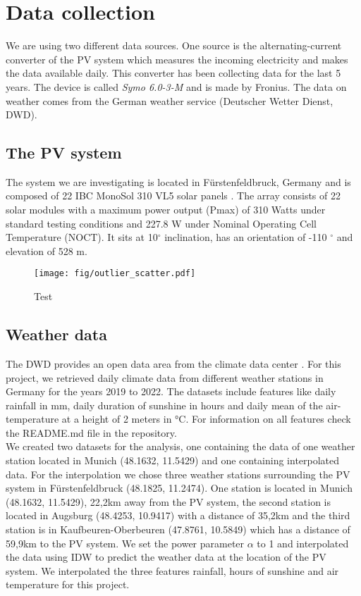\documentclass{article}
\begin{document}
\section{Data collection}
We are using two different data sources. One source is the alternating-current converter of the PV system which measures the incoming electricity and makes the data available daily.
This converter has been collecting data for the last 5 years. The device is called \textit{Symo 6.0-3-M} and is made by Fronius.
The data on weather comes from the German weather service (Deutscher Wetter Dienst, DWD).
\subsection{The PV system}
The system we are investigating is located in Fürstenfeldbruck, Germany and is composed of 22 IBC MonoSol 310 VL5 solar panels \cite{MonoSol}.
The array consists of 22 solar modules with a maximum power output (Pmax) of 310 Watts under standard testing conditions and 227.8 W  under Nominal Operating Cell Temperature (NOCT).
It sits at 10$^\circ$ inclination, has an orientation of -110 $^\circ$ and elevation of 528 m.
\begin{figure*}
	\texttt{[image: fig/outlier\_scatter.pdf]}
	\caption{Test}
\end{figure*}

\subsection{Weather data}
The DWD provides an open data area from the climate data center \cite{CDC}. 
For this project, we retrieved daily climate data from different weather stations in Germany for the years 2019 to 2022. 
The datasets include features like daily rainfall in mm, daily duration of sunshine in hours and daily mean of the air-temperature at a height of 2 meters in °C. 
For information on all features check the README.md file in the repository. \\ 
We created two datasets for the analysis, one containing the data of one weather station located in Munich (48.1632, 11.5429) and one containing interpolated data. For the interpolation we chose three weather stations surrounding the PV system in Fürstenfeldbruck (48.1825, 11.2474). 
One station is located in Munich (48.1632, 11.5429), 22,2km away from the PV system, the second station is located in Augsburg (48.4253, 10.9417) with a distance of 35,2km and the third station is in Kaufbeuren-Oberbeuren (47.8761, 10.5849) which has a distance of 59,9km to the PV system. 
We set the power parameter $\alpha$ to 1 and interpolated the data using IDW to predict the weather data at the location of the PV system. We interpolated the three features rainfall, hours of sunshine and air temperature for this project.
\end{document}
